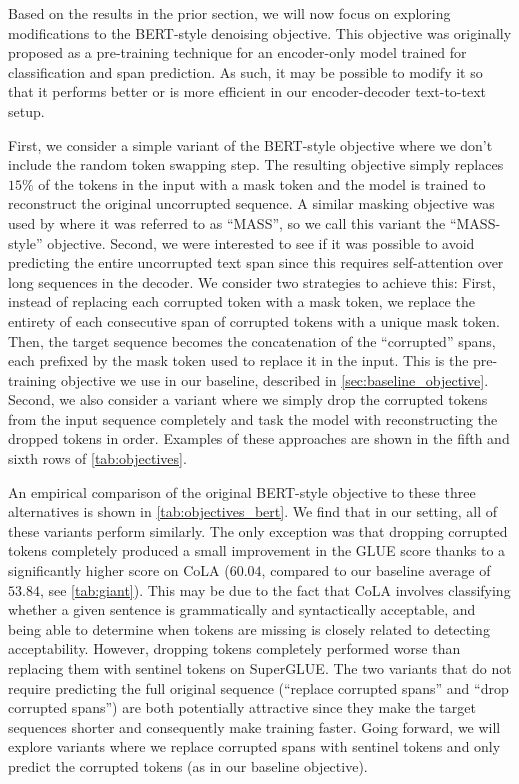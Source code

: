 Based on the results in the prior section, we will now focus on exploring modifications to the BERT-style denoising objective. This objective was originally proposed as a pre-training technique for an encoder-only model trained for classification and span prediction. As such, it may be possible to modify it so that it performs better or is more efficient in our encoder-decoder text-to-text setup.

First, we consider a simple variant of the BERT-style objective where we don't include the random token swapping step. The resulting objective simply replaces $15\%$ of the tokens in the input with a mask token and the model is trained to reconstruct the original uncorrupted sequence. A similar masking objective was used by \cite{song2019mass} where it was referred to as ``MASS'', so we call this variant the ``MASS-style'' objective. Second, we were interested to see if it was possible to avoid predicting the entire uncorrupted text span since this requires self-attention over long sequences in the decoder. We consider two strategies to achieve this: First, instead of replacing each corrupted token with a mask token, we replace the entirety of each consecutive span of corrupted tokens with a unique mask token. Then, the target sequence becomes the concatenation of the ``corrupted'' spans, each prefixed by the mask token used to replace it in the input. This is the pre-training objective we use in our baseline, described in \ref{sec:baseline_objective}.
Second, we also consider a variant where we simply drop the corrupted tokens from the input sequence completely and task the model with reconstructing the dropped tokens in order. Examples of these approaches are shown in the fifth and sixth rows of \ref{tab:objectives}.

An empirical comparison of the original BERT-style objective to these three alternatives is shown in \ref{tab:objectives_bert}.
We find that in our setting, all of these variants perform similarly. The only exception was that dropping corrupted tokens completely produced a small improvement in the GLUE score thanks to a significantly higher score on CoLA ($60.04$, compared to our baseline average of $53.84$, see \ref{tab:giant}).
This may be due to the fact that CoLA involves classifying whether a given sentence is grammatically and syntactically acceptable, and being able to determine when tokens are missing is closely related to detecting acceptability. However, dropping tokens completely performed worse than replacing them with sentinel tokens on SuperGLUE. The two variants that do not require predicting the full original sequence (``replace corrupted spans'' and ``drop corrupted spans'') are both potentially attractive since they make the target sequences shorter and consequently make training faster. Going forward, we will explore variants where we replace corrupted spans with sentinel tokens and only predict the corrupted tokens (as in our baseline objective).

